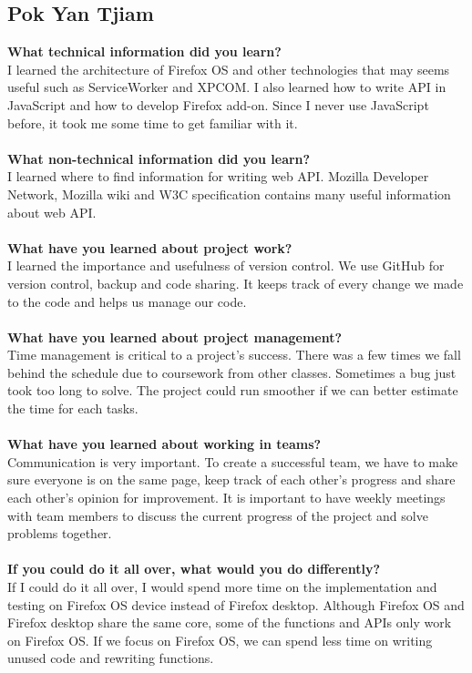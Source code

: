 \documentclass[12pt]{article}
\begin{document}
\subsection{Pok Yan Tjiam}
\textbf{What technical information did you learn?}\\
I learned the architecture of Firefox OS and other technologies that may seems useful such as ServiceWorker and XPCOM. I also learned how to write API in JavaScript and how to develop Firefox add-on. Since I never use JavaScript before, it took me some time to get familiar with it.
\\\\
\textbf{What non-technical information did you learn?}\\
I learned where to find information for writing web API. Mozilla Developer Network, Mozilla wiki and W3C specification contains many useful information about web API.
\\\\
\textbf{What have you learned about project work?}\\
I learned the importance and usefulness of version control. We use GitHub for version control, backup and code sharing. It keeps track of every change we made to the code and helps us manage our code.
\\\\
\textbf{What have you learned about project management?}\\
Time management is critical to a project's success. There was a few times we fall behind the schedule due to coursework from other classes. Sometimes a bug just took too long to solve. The project could run smoother if we can better estimate the time for each tasks.
\\\\
\textbf{What have you learned about working in teams?}\\
Communication is very important. To create a successful team, we have to make sure everyone is on the same page, keep track of each other's progress and share each other's opinion for improvement. It is important to have weekly meetings with team members to discuss the current progress of the project and solve problems together.
\\\\
\textbf{If you could do it all over, what would you do differently?}\\
If I could do it all over, I would spend more time on the implementation and testing on Firefox OS device instead of Firefox desktop. Although Firefox OS and Firefox desktop share the same core, some of the functions and APIs only work on Firefox OS. If we focus on Firefox OS, we can spend less time on writing unused code and rewriting functions.
\\
\pagebreak
\end{document}
